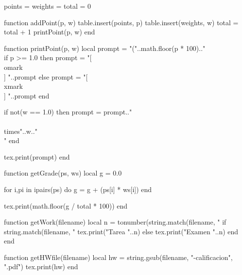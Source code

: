 \usepackage[a4paper, top=2cm]{geometry}
\usepackage[spanish,mexico]{babel}
\usepackage[dvipsnames]{xcolor}
\usepackage{xfp}
\usepackage{pifont}
\usepackage{luacode}
\usepackage{pdfpages}
\usepackage{amsmath,enumerate}


\newcommand{\omark}{{\color{OliveGreen}\ding{52}}}
\newcommand{\xmark}{{\color{Bittersweet}\ding{56}}}
\newcommand{\point}[2][1.0]{\item\textbf{\directlua{addPoint(#2, #1)}} }
\newcommand{\grade}{\directlua{getGrade(points, weights)} }
\newcommand{\work}{\directlua{getWork(\luastring\jobname)} }
\newcommand{\fullname}{\directlua{getFullname(\luastring\jobname)} }

\begin{luacode*}

    points = {}
    weights = {}
    total = 0

    function addPoint(p, w)
        table.insert(points, p)
        table.insert(weights, w)
        total = total + 1
        printPoint(p, w)
    end

    function printPoint(p, w)
        local prompt = "("..math.floor(p * 100).."\\%

        if p >= 1.0 then
            prompt = "[ \\omark \\ ] "..prompt
        else
            prompt = "[ \\xmark \\ ] "..prompt
        end

        if not(w == 1.0) then
            prompt = prompt.." \\{\\times"..w.."\\}"
        end

        tex.print(prompt)
    end

    function getGrade(ps, ws)
        local g = 0.0

        for i,pi in ipairs(ps) do
            g = g + (ps[i] * ws[i])
        end

        tex.print(math.floor(g / total * 100))
    end

    function getWork(filename)
        local n = tonumber(string.match(filename, "%
        if string.match(filename, "%
            tex.print("Tarea "..n)
        else
            tex.print("Examen "..n)
        end
    end

    function getHWfile(filename)
        local hw = string.gsub(filename, "-calificacion", ".pdf")
        tex.print(hw)
    end


\end{luacode*}
